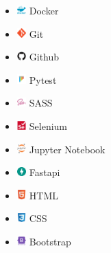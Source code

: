 \documentclass{article}
\begin{document}
\begin{multicols}{3}
\begin{itemize}
    \item \includegraphics[height=10pt]{images/icons/docker.png} Docker
    \item \includegraphics[height=10pt]{images/icons/git-original.png} Git
    \item \includegraphics[height=10pt]{images/icons/github-original.png} Github
    \item \includegraphics[height=10pt]{images/icons/pytest-original.png} Pytest 
    \item \includegraphics[height=10pt]{images/icons/sass-original.png} SASS
    \item \includegraphics[height=10pt]{images/icons/selenium-original.png} Selenium 
    \item \includegraphics[height=10pt]{images/icons/jupyter-original-wordmark.png} Jupyter Notebook
    \item \includegraphics[height=10pt]{images/icons/fastapi-original.png} Fastapi
    \item \includegraphics[height=10pt]{images/icons/html5-original.png} HTML
    \item \includegraphics[height=10pt]{images/icons/css3.png} CSS
    \item \includegraphics[height=10pt]{images/icons/bootstrap.png} Bootstrap

\end{itemize}
\end{multicols}
\end{document}
